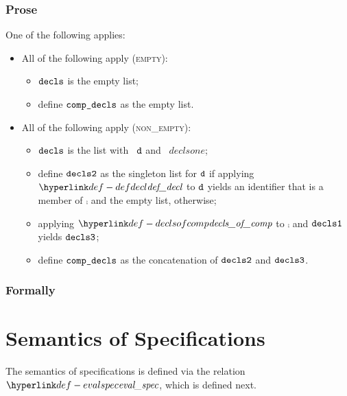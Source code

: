 \subsubsection{Prose}
One of the following applies:
\begin{itemize}
  \item All of the following apply (\textsc{empty}):
  \begin{itemize}
    \item $\texttt{decls}$ is the empty list;
    \item define $\texttt{comp\_decls}$ as the empty list.
  \end{itemize}

  \item All of the following apply (\textsc{non\_empty}):
  \begin{itemize}
    \item $\texttt{decls}$ is the list with \head\ $\texttt{d}$ and \tail\ $declsone$;
    \item define $\texttt{decls2}$ as the singleton list for $\texttt{d}$ if applying $\defdecl$ to $\texttt{d}$ yields an identifier
          that is a member of $\comp$ and the empty list, otherwise;
    \item applying $\declsofcomp$ to $\comp$ and $\texttt{decls1}$ yields $\texttt{decls3}$;
    \item define $\texttt{comp\_decls}$ as the concatenation of $\texttt{decls2}$ and $\texttt{decls3}$.
  \end{itemize}
\end{itemize}

\subsubsection{Formally}

\section{Semantics of Specifications\label{sec:SemanticsOfSpecifications}}
The semantics of specifications is defined via the relation $\evalspec$, which is defined next.

